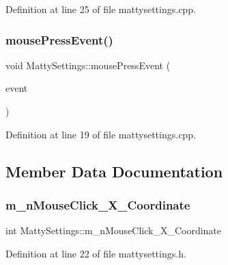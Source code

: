 Definition at line 25 of file mattysettings.\+cpp.

\hypertarget{classMattySettings_aedf4cc84f37e25a7704e1ced6c18df95}{}\label{classMattySettings_aedf4cc84f37e25a7704e1ced6c18df95} 
\subsubsection{\texorpdfstring{mouse\+Press\+Event()}{mousePressEvent()}}
{\footnotesize\ttfamily void Matty\+Settings\+::mouse\+Press\+Event (\begin{DoxyParamCaption}\item[{Q\+Mouse\+Event $\ast$}]{event }\end{DoxyParamCaption})\hspace{0.3cm}{\ttfamily [private]}}



Definition at line 19 of file mattysettings.\+cpp.



\subsection{Member Data Documentation}
\hypertarget{classMattySettings_aa1c8051298eee4d2e77a93af3ddeb9d0}{}\label{classMattySettings_aa1c8051298eee4d2e77a93af3ddeb9d0} 
\subsubsection{\texorpdfstring{m\+\_\+n\+Mouse\+Click\+\_\+\+X\+\_\+\+Coordinate}{m\_nMouseClick\_X\_Coordinate}}
{\footnotesize\ttfamily int Matty\+Settings\+::m\+\_\+n\+Mouse\+Click\+\_\+\+X\+\_\+\+Coordinate\hspace{0.3cm}{\ttfamily [private]}}



Definition at line 22 of file mattysettings.\+h.

\hypertarget{classMattySettings_a622b01c6b81a35e28b414079eaff132e}{}\label{classMattySettings_a622b01c6b81a35e28b414079eaff132e} 
